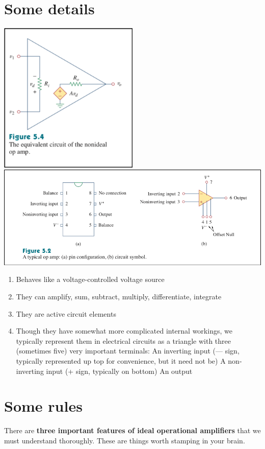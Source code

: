 \documentclass[11pt]{book}
\begin{document}
\section{Some details}
\includegraphics[width=0.5\textwidth]{figures/op-amp1}
\\
\includegraphics[width=\textwidth]{figures/op-amp2}

\begin{enumerate}
	\item Behaves like a voltage-controlled voltage source
	\item They can amplify, sum, subtract, multiply, differentiate, integrate
	\item They are active circuit elements
	\item Though they have somewhat more complicated internal workings, we typically represent them in electrical circuits as a triangle with three (sometimes five) very important terminals:
	\subitem An inverting input (— sign, typically represented up top for convenience, but it need not be)
	\subitem A non-inverting input (+ sign, typically on bottom)
	\subitem An output
\end{enumerate}

\section{Some rules}
There are \textbf{three important features of ideal operational amplifiers} that we must understand thoroughly. These are things worth stamping in your brain.
\end{document}
